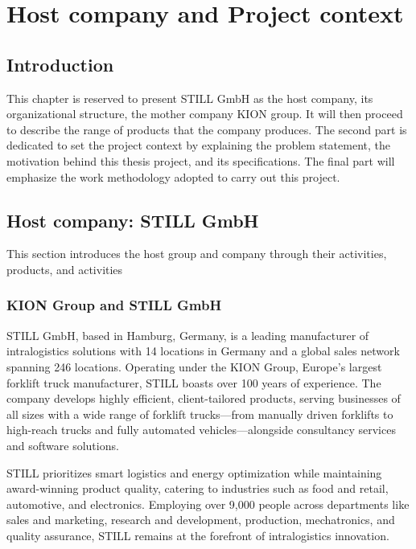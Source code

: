 \chapter{Host company and Project context}

\renewcommand{\chaptername}{Chapter}

\section*{Introduction}

This chapter is reserved to present STILL GmbH as the host company, its organizational structure, the mother 
company KION group. It will then proceed to describe the range of products that the company produces.
The second part is dedicated to set the project context by explaining the problem statement, the motivation 
behind this thesis project, and its specifications.
The final part will emphasize the work methodology adopted to carry out this project.

\begin{sloppypar}
\section{Host company: STILL GmbH}
\end{sloppypar}

This section introduces the host group and company through their activities, products, and activities

\subsection{KION Group and STILL GmbH}

STILL GmbH, based in Hamburg, Germany, is a leading manufacturer of intralogistics solutions with 14 locations 
in Germany and a global sales network spanning 246 locations. 
Operating under the KION Group, Europe’s largest forklift truck manufacturer, STILL boasts over 100 years of 
experience. The company develops highly efficient, client-tailored products, serving businesses of all sizes 
with a wide range of forklift trucks—from manually driven forklifts to high-reach trucks and fully automated 
vehicles—alongside consultancy services and software solutions. 

STILL prioritizes smart logistics and energy optimization while maintaining award-winning product quality, 
catering to industries such as food and retail, automotive, and electronics. Employing over 9,000 people across 
departments like sales and marketing, research and development, production, mechatronics, and quality assurance, 
STILL remains at the forefront of intralogistics innovation. 

